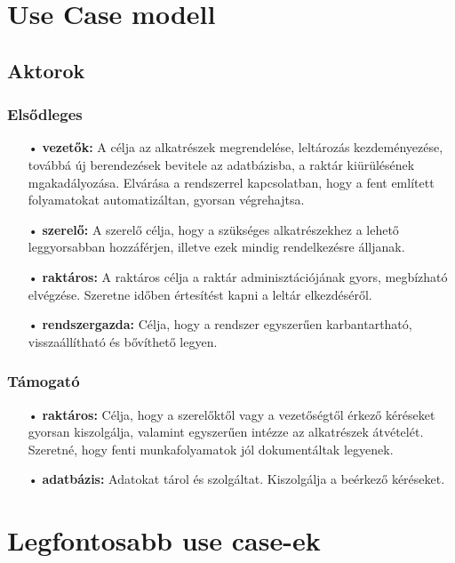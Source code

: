 \documentclass[12pt]{article}\usepackage[left=20mm,right=20mm,top=15mm,bottom=20mm]{geometry}
\begin{document}
\section{Use Case modell}
\subsection{Aktorok}
\subsubsection{Elsődleges}
\begin{itemize}
\item[•] \textbf{vezetők: }  A célja az alkatrészek megrendelése, leltározás kezdeményezése, továbbá új berendezések bevitele az adatbázisba, a raktár kiürülésének mgakadályozása. Elvárása a rendszerrel kapcsolatban, hogy a fent említett folyamatokat automatizáltan, gyorsan végrehajtsa.
 
\item[•] \textbf{szerelő: } A szerelő célja, hogy a szükséges alkatrészekhez a lehető leggyorsabban hozzáférjen, illetve ezek mindig rendelkezésre álljanak.

\item[•] \textbf{raktáros: } A raktáros célja a raktár adminisztációjának gyors, megbízható elvégzése. 
Szeretne időben értesítést kapni a leltár elkezdéséről.

\item[•] \textbf{rendszergazda: } Célja, hogy a rendszer egyszerűen karbantartható, visszaállítható és bővíthető legyen.
\end{itemize}

\subsubsection{Támogató}
\begin{itemize}
\item[•] \textbf{raktáros: } Célja, hogy a szerelőktől vagy a vezetőségtől érkező kéréseket gyorsan kiszolgálja, valamint egyszerűen intézze az alkatrészek átvételét.
Szeretné, hogy fenti munkafolyamatok jól dokumentáltak legyenek.

\item[•] \textbf{adatbázis: } Adatokat tárol és szolgáltat. Kiszolgálja a beérkező kéréseket.
\end{itemize}

\section{Legfontosabb use case-ek}
\end{document}
